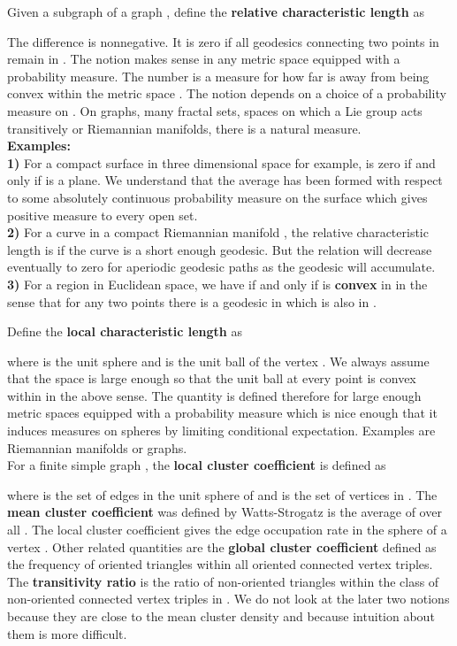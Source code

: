 \documentclass[12pt]{amsart}
\theoremstyle{definition}
\begin{document}
Given a subgraph  of a graph , define the {\bf relative characteristic length} as

The difference  is nonnegative. It is zero if all geodesics 
connecting two points in  remain in . The notion makes sense in any metric 
space equipped with a probability measure. The number  is a measure for how 
far  is away from being convex within the metric space . The notion depends on a choice
of a probability measure on . On graphs, many fractal sets, spaces on which a Lie group
acts transitively or Riemannian manifolds, there is a natural measure. \\ 

{\bf Examples: } \\
{\bf 1)} For a compact surface  in three dimensional space  for example,
 is zero if and only if  is a plane. We understand that the average has been
formed with respect to some absolutely continuous probability measure on the surface  
which gives positive measure to every open set. \\
{\bf 2)} For a curve in a compact Riemannian 
manifold , the relative characteristic length is  if the curve is a short
enough geodesic. But the relation  will decrease eventually to zero for
aperiodic geodesic paths  as the geodesic will accumulate. \\
{\bf 3)} For a region  in Euclidean space, we have  if and 
only if  is {\bf convex} in  in the sense that for any two points 
there is a geodesic in  which is also in . 

Define the {\bf local characteristic length}  as

where  is the unit sphere and  is the unit ball of the vertex . We always 
assume that the space is large enough so that the unit ball at every point is convex within  
in the above sense. 
The quantity  is defined therefore for large enough 
metric spaces equipped with a probability measure  which is nice enough that
it induces measures on spheres  by limiting conditional expectation. Examples
are Riemannian manifolds or graphs. \\

For a finite simple graph , the {\bf local cluster coefficient} is defined as 

where  is the set of edges in the unit sphere  of  and  
is the set of vertices in . The {\bf mean cluster coefficient}  was defined 
by Watts-Strogatz is the average of  over all . The local cluster
coefficient gives the edge occupation rate in the sphere  of a vertex . 
Other related quantities are the {\bf global cluster coefficient} 
defined as the frequency of oriented triangles  within 
all oriented connected vertex triples. The {\bf transitivity ratio} is the ratio 
of non-oriented triangles within the class of non-oriented connected vertex triples in . 
We do not look at the later two notions because they are close to the mean cluster
density and because intuition about them is more difficult.  \\
\end{document}
